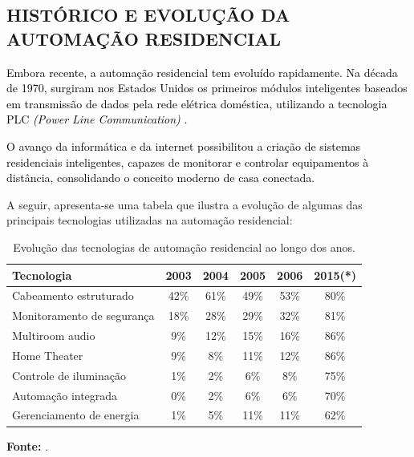     \subsection{HISTÓRICO E EVOLUÇÃO DA AUTOMAÇÃO RESIDENCIAL}

        \textcolor{black}{Embora recente, a automação residencial tem evoluído rapidamente. Na década de 1970, surgiram nos Estados Unidos os primeiros módulos inteligentes baseados em transmissão de dados pela rede elétrica doméstica, utilizando a tecnologia PLC \textit{(Power Line Communication)} \cite{automacaoResidencialCap1}.}

        \textcolor{black}{O avanço da informática e da internet possibilitou a criação de sistemas residenciais inteligentes, capazes de monitorar e controlar equipamentos à distância, consolidando o conceito moderno de casa conectada.}

        A seguir, apresenta-se uma tabela que ilustra a evolução de algumas das principais tecnologias utilizadas na automação residencial:

        \begin{table}[H]
            \centering
            \renewcommand{\arraystretch}{1.3}
            \setlength{\tabcolsep}{10pt}
            \begin{tabular}{lccccc}
            \hline
            \textbf{Tecnologia} & \textbf{2003} & \textbf{2004} & \textbf{2005} & \textbf{2006} & \textbf{2015(*)} \\
            \hline
            Cabeamento estruturado & 42\% & 61\% & 49\% & 53\% & 80\% \\
            Monitoramento de segurança & 18\% & 28\% & 29\% & 32\% & 81\% \\
            Multiroom audio & 9\% & 12\% & 15\% & 16\% & 86\% \\
            Home Theater & 9\% & 8\% & 11\% & 12\% & 86\% \\
            Controle de iluminação & 1\% & 2\% & 6\% & 8\% & 75\% \\
            Automação integrada & 0\% & 2\% & 6\% & 6\% & 70\% \\
            Gerenciamento de energia & 1\% & 5\% & 11\% & 11\% & 62\% \\
            \hline
            \end{tabular}
            \caption{Evolução das tecnologias de automação residencial ao longo dos anos.}
            \label{tab:tecnologias-automacao}

            \vspace{0.5em}
            \small
            \textbf{Fonte:} \cite{automacaoResidencialCap1}.\\
        \end{table}


